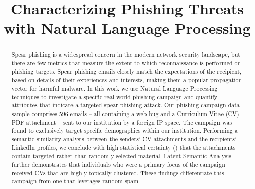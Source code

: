 \documentclass[conference]{IEEEtran}
\begin{document}
\title{Characterizing Phishing Threats with Natural Language Processing}


\author{
\and
{}
}














\maketitle


\begin{abstract}
Spear phishing is a widespread concern in the modern network security landscape, but there are few metrics that measure the extent to which reconnaissance is performed on phishing targets.  Spear phishing emails closely match the expectations of the recipient, based on details of their experiences and interests, making them a popular propagation vector for harmful malware.  In this work we use Natural Language Processing techniques to investigate a specific real-world phishing campaign and quantify attributes that indicate a targeted spear phishing attack.  Our phishing campaign data sample comprises 596 emails -- all containing a web bug and a Curriculum Vitae (CV) PDF attachment --  sent to our institution by a foreign IP space.  The campaign was found to exclusively target specific demographics within our institution.  Performing a semantic similarity analysis between the senders' CV attachments and the recipients' LinkedIn profiles, we conclude with high statistical certainty () that the attachments contain targeted rather than randomly selected material.  Latent Semantic Analysis further demonstrates that individuals who were a primary focus of the campaign received CVs that are highly topically clustered.  These findings differentiate this campaign from one that leverages random spam.  
\end{abstract}
\end{document}
